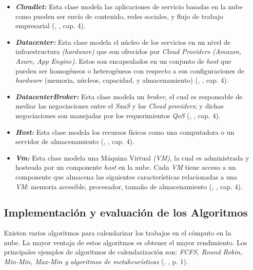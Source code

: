 \begin{itemize}
	\item \textit{\textbf{Cloudlet:}} Esta clase modela las aplicaciones de servicio basadas en la nube como pueden ser env\'io de contenido, redes sociales, y flujo de trabajo empresarial (\citeauthor{calheiros2011cloudsim}, \citeyear{calheiros2011cloudsim}, cap. 4).
	\item \textit{ \textbf{Datacenter:}} Esta clase modela el núcleo de los servicios en un nivel de infraestructura \textit{(hardware)} que son ofrecidos por \textit{Cloud Providers (Amazon, Azure, App Engine)}. Estos son encapsulados en un conjunto de \textit{host} que pueden ser homogéneos o heterogéneos con respecto a sus configuraciones de \textit{hardware} (memoria, n\'ucleos, capacidad, y almacenamiento) (\citeauthor{calheiros2011cloudsim}, \citeyear{calheiros2011cloudsim}, cap. 4).
	\item \textit{ \textbf{DatacenterBroker:}} Esta clase modela un \textit{broker}, el cual es responsable de mediar las negociaciones entre el \textit{SaaS} y los \textit{Cloud providers}; y dichas negociaciones son manejadas por los requerimientos \textit{QoS} (\citeauthor{calheiros2011cloudsim}, \citeyear{calheiros2011cloudsim}, cap. 4).
	\item  \textit{\textbf{Host:}} Esta clase modela los recursos f\'isicos como una computadora o un servidor de almacenamiento (\citeauthor{calheiros2011cloudsim}, \citeyear{calheiros2011cloudsim}, cap. 4).
	\item  \textit{\textbf{Vm:}} Esta clase modela una M\'aquina Virtual \textit{(VM)}, la cual es administrada y hosteada por un componente \textit{host} en la nube. Cada \textit{VM} tiene acceso a un componente que almacena las siguientes características relacionadas a una \textit{VM}: memoria accesible, procesador, tamaño de almacenamiento (\citeauthor{calheiros2011cloudsim}, \citeyear{calheiros2011cloudsim}, cap. 4).
\end{itemize}


\newpage

\subsection{Implementaci\'on y evaluación de los Algoritmos}

Existen varios algoritmos para calendarizar los trabajos en el c\'omputo en la nube. La mayor ventaja de estos algoritmos es obtener el mayor rendimiento. Los principales ejemplos de algoritmos de calendarizaci\'on son: \textit{FCFS, Round Robin, Min-Min, Max-Min y algoritmos de metaheurísticas}  (\citeauthor{shimpy2014different}, \citeyear{shimpy2014different}, p. 1).



